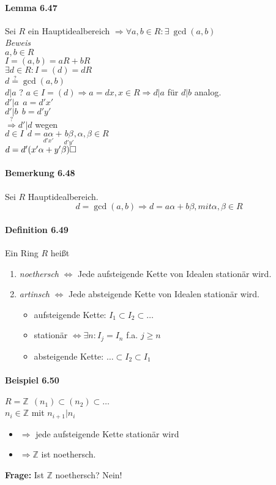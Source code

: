 \documentclass{scrartcl}
\begin{document}
\paragraph{Lemma 6.47}
Sei $R$ ein Hauptidealbereich $\Rightarrow \forall a,b \in R: \exists ~ \gcd(a,b)$
\\
\textit{Beweis} \\
$a,b \in R$ \\
$ I = (a,b) = aR + bR$ \\
$\exists d \in R: I = (d) = dR$ \\
$d \overset{?}{=} \gcd(a,b)$ \\
$d|a$ ? $a \in I = (d) \Rightarrow a = dx, x \in R \Rightarrow d|a$ für $d|b$ analog.
\\
$d'|a ~~ a = d'x'$ \\
$d'|b ~~ b = d'y'$ \\
$\overset{?}{\Rightarrow} d'|d$ wegen \\
$d \in I ~~ d = \underset{d'x'}{a \alpha}
+ \underset{d'y'}{b \beta} , \alpha, \beta \in R$ \\
$d = d'(x' \alpha + y' \beta) \hfill \square$

\paragraph{Bemerkung 6.48}
Sei $R$ Hauptidealbereich.
\[
  d = \gcd(a,b) \Rightarrow d = a\alpha + b\beta, mit \alpha,\beta \in R
\]

\paragraph{Definition 6.49}
Ein Ring $R$ heißt
\begin{enumerate}
\item \textit{noethersch} $\Leftrightarrow$ Jede aufsteigende Kette von Idealen
  stationär wird.
\item \textit{artinsch} $\Leftrightarrow $ Jede absteigende Kette von Idealen
  stationär wird.
  \begin{itemize}
  \item aufsteigende Kette: $I_1 \subset I_2 \subset \dots$
  \item stationär $\Leftrightarrow \exists n: I_j = I_n$ f.a. $j \geq n$
  \item absteigende Kette: $\dots \subset I_2 \subset I_1$
\end{itemize}
\end{enumerate}

\paragraph{Beispiel 6.50}
$R = \mathbb{Z} ~~ (n_1) \subset (n_2) \subset \dots$ \\
$n_i \in \mathbb{Z}$ mit $n_{i+1}|n_i$ \\
\begin{itemize}
 \item $\Rightarrow$ jede aufsteigende Kette stationär wird
\item $\Rightarrow \mathbb{Z}$ ist noethersch.
\end{itemize}
\textbf{Frage:} Ist $\mathbb{Z}$ noethersch? Nein!
\end{document}
